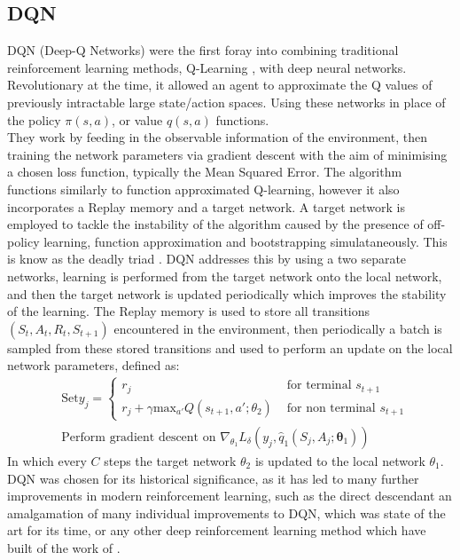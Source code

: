 \documentclass{article}
\begin{document}
\subsection{DQN}
DQN (Deep-Q Networks) \citep{dqn} were the first foray into combining traditional reinforcement learning methods, Q-Learning \citep{qlearning}, with deep neural networks. Revolutionary at the time, it allowed an agent to approximate the Q values of previously intractable large state/action spaces. Using these networks in place of the policy $\pi(s,a)$, or value $q(s,a)$ functions.\\\newline
They work by feeding in the observable information of the environment, then training the network parameters via gradient descent with the aim of minimising a chosen loss function, typically the Mean Squared Error. The algorithm functions similarly to function approximated Q-learning, however it also incorporates a Replay memory and a target network. A target network is employed to tackle the instability of the algorithm caused by the presence of off-policy learning, function approximation and bootstrapping simulataneously. This is know as the deadly triad \citep{deadlytriad}. DQN addresses this by using a two separate networks, learning is performed from the target network onto the local network, and then the target network is updated periodically which improves the stability of the learning. The Replay memory is used to store all transitions $(S_{t},A_{t},R_{t},S_{t+1})$ encountered in the environment, then periodically a batch is sampled from these stored transitions and used to perform an update on the local network parameters, defined as:
\begin{equation}
\begin{aligned}
    &\text{Set} y_{j} = 
    \begin{cases}
    r_{j} & \text{ for terminal } s_{t+1}\\    
    r_{j} + \gamma\text{max}_{a'}Q(s_{t+1},a'; \theta_{2}) & \text{ for non terminal } s_{t+1}
    \end{cases}\\
    &\text{Perform gradient descent on } \nabla_{\theta_{1}}L_{\delta}(y_{j},\hat{q}_{1}(S_{j},A_{j};\boldsymbol{\theta}_{1}))
\end{aligned}
\end{equation}
In which every $C$ steps the target network $\theta_{2}$ is updated to the local network $\theta_{1}$.\\\newline
DQN was chosen for its historical significance, as it has led to many further improvements in modern reinforcement learning, such as the direct descendant \citet{rainbow} an amalgamation of many individual improvements to DQN, which was state of the art for its time, or any other deep reinforcement learning method which have built of the work of \citet{dqn}. 
\end{document}
